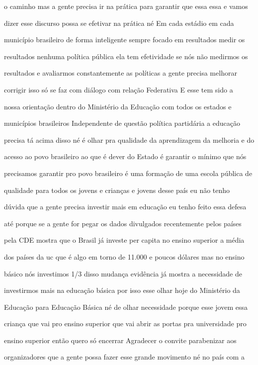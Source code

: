 \documentclass[a4paper,12pt]{article}
\begin{document}
o caminho mas a gente precisa ir na prática para garantir que essa essa e vamos

dizer esse discurso possa se efetivar na prática né Em cada estádio em cada

município brasileiro de forma inteligente sempre focado em resultados medir os

resultados nenhuma política pública ela tem efetividade se nós não medirmos os

resultados e avaliarmos constantemente as políticas a gente precisa melhorar

corrigir isso só se faz com diálogo com relação Federativa E esse tem sido a

nossa orientação dentro do Ministério da Educação com todos os estados e

municípios brasileiros Independente de questão política partidária a educação

precisa tá acima disso né é olhar pra qualidade da aprendizagem da melhoria e do

acesso ao povo brasileiro ao que é dever do Estado é garantir o mínimo que nós

precisamos garantir pro povo brasileiro é uma formação de uma escola pública de

qualidade para todos os jovens e crianças e jovens desse país eu não tenho

dúvida que a gente precisa investir mais em educação eu tenho feito essa defesa

até porque se a gente for pegar os dados divulgados recentemente pelos países

pela CDE mostra que o Brasil já investe per capita no ensino superior a média

dos países da uc que é algo em torno de 11.000 e poucos dólares mas no ensino

básico nós investimos 1/3 disso mudança evidência já mostra a necessidade de

investirmos mais na educação básica por isso esse olhar hoje do Ministério da

Educação para Educação Básica né de olhar necessidade porque esse jovem essa

criança que vai pro ensino superior que vai abrir as portas pra universidade pro

ensino superior então quero só encerrar Agradecer o convite parabenizar aos

organizadores que a gente possa fazer esse grande movimento né no país com a
\end{document}
